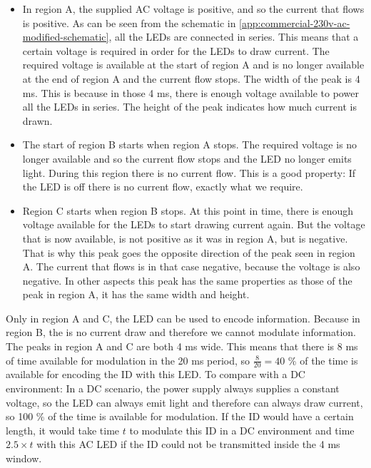 \begin{itemize}
	\item In region A, the supplied AC voltage is positive, and so the current that flows is positive.
	As can be seen from the schematic in \autoref{app:commercial-230v-ac-modified-schematic}, all the LEDs are connected in series.
	This means that a certain voltage is required in order for the LEDs to draw current.
	The required voltage is available at the start of region A and is no longer available at the end of region A and the current flow stops.
	The width of the peak is 4 ms.
	This is because in those 4 ms, there is enough voltage available to power all the LEDs in series. 
	The height of the peak indicates how much current is drawn.

	\item The start of region B starts when region A stops.
	The required voltage is no longer available and so the current flow stops and the LED no longer emits light.
	During this region there is no current flow.
	This is a good property: If the LED is off there is no current flow, exactly what we require.

	\item Region C starts when region B stops.
	At this point in time, there is enough voltage available for the LEDs to start drawing current again.
	But the voltage that is now available, is not positive as it was in region A, but is negative.
	That is why this peak goes the opposite direction of the peak seen in region A.
	The current that flows is in that case negative, because the voltage is also negative.
	In other aspects this peak has the same properties as those of the peak in region A, it has the same width and height.

\end{itemize}


Only in region A and C, the LED can be used to encode information.
Because in region B, the is no current draw and therefore we cannot modulate information.
The peaks in region A and C are both 4 ms wide.
This means that there is 8 ms of time available for modulation in the 20 ms period, so $\frac{8}{20} = 40$ \% of the time is available for encoding the ID with this LED.
To compare with a DC environment: In a DC scenario, the power supply always supplies a constant voltage, so the LED can always emit light and therefore can always draw current, so 100 \% of the time is available for modulation.
If the ID would have a certain length, it would take time $t$ to modulate this ID in a DC environment and time $2.5 \times t$ with this AC LED if the ID could not be transmitted inside the 4 ms window. 


